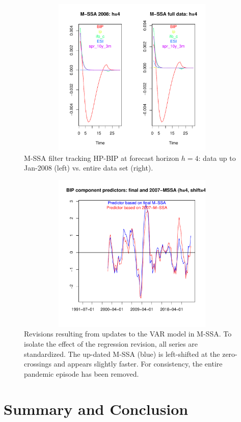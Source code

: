 \documentclass[a4paper]{article}
\begin{document}
\begin{figure}[H]\begin{center}\includegraphics[height=3in, width=4.5in]{./Figures/bk_2008_all.pdf}\caption{M-SSA filter tracking HP-BIP at forecast horizon $h=4$: data up to Jan-2008 (left) vs. entire data set (right).\label{bk_2008_all}}\end{center}\end{figure}

\begin{figure}[H]\begin{center}\includegraphics[height=3in, width=4.5in]{./Figures/revisions3.pdf}\caption{Revisions resulting from updates to the VAR model in M-SSA. To isolate the effect of the regression revision, all series are standardized. The up-dated M-SSA (blue) is left-shifted at the zero-crossings and appears slightly faster. For consistency, the entire pandemic episode has been removed.\label{revisions3}}\end{center}\end{figure}


\section{Summary and Conclusion}
\end{document}
